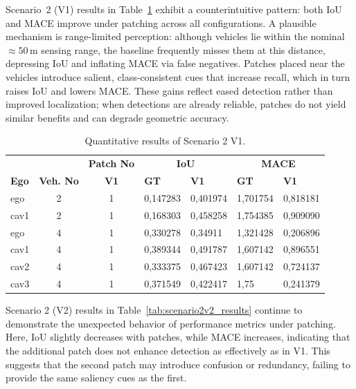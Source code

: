 Scenario~2 (V1) results in Table~\ref{tab:scenario2v1_results} exhibit a counterintuitive pattern: both IoU and MACE improve under patching across all configurations.
A plausible mechanism is range-limited perception: although vehicles lie within the nominal \(\approx 50\,\mathrm{m}\) sensing range, the baseline frequently misses them at this distance, depressing IoU and inflating MACE via false negatives.
Patches placed near the vehicles introduce salient, class-consistent cues that increase recall, which in turn raises IoU and lowers MACE.
These gains reflect eased detection rather than improved localization; when detections are already reliable, patches do not yield similar benefits and can degrade geometric accuracy.

\sloppy

\begin{table}[H]
    \centering
    \caption{Quantitative results of Scenario 2 V1.}
    \label{tab:scenario2v1_results}
    \begin{tabularx}{\textwidth}{l c c *{4}{X}}
        \toprule
            &             &   \multicolumn{1}{c}{\textbf{Patch No}}  & \multicolumn{2}{c}{\textbf{IoU}} & \multicolumn{2}{c}{\textbf{MACE}}                            \\
        \cmidrule(lr){4-5}\cmidrule(lr){6-7}
        \textbf{Ego}           &
        \textbf{Veh. No}       &
        \textbf{V1}      &
        \textbf{GT}            & \textbf{V1}  &
        \textbf{GT}            & \textbf{V1}  \\
        \midrule %
        ego        & 2  & 1 & 0,147283 & 0,401974 & 1,701754 & 0,818181 \\
        cav1         & 2  & 1 & 0,168303 & 0,458258 & 1,754385 & 0,909090 \\
        \midrule
        ego        & 4  & 1 & 0,330278 & 0,34911 & 1,321428 & 0,206896  \\
        cav1         & 4  & 1 & 0,389344 & 0,491787 & 1,607142 & 0,896551 \\
        cav2        & 4  & 1 & 0,333375 & 0,467423 & 1,607142 & 0,724137 \\
        cav3        & 4  & 1 & 0,371549 & 0,422417 & 1,75 & 0,241379 \\
        \bottomrule
    \end{tabularx}
\end{table}

Scenario 2 (V2) results in Table~\ref{tab:scenario2v2_results} continue to demonstrate the unexpected behavior of performance metrics under patching.
Here, IoU slightly decreases with patches, while MACE increases, indicating that the additional patch does not enhance detection as effectively as in V1.
This suggests that the second patch may introduce confusion or redundancy, failing to provide the same saliency cues as the first.


